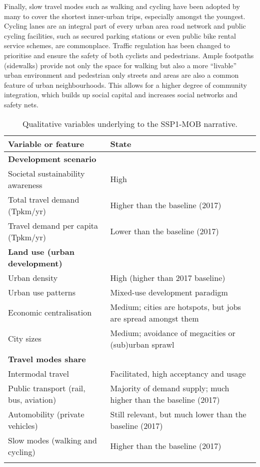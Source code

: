 {Finally, slow travel modes such as walking and cycling have been adopted by many to cover the shortest inner-urban trips, especially amongst the youngest. Cycling lanes are an integral part of every urban area road network and public cycling facilities, such as secured parking stations or even public bike rental service schemes, are commonplace. Traffic regulation has been changed to prioritise and ensure the safety of both cyclists and pedestrians. Ample footpaths (sidewalks) provide not only the space for walking but also a more ``livable'' urban environment and pedestrian only streets and areas are also a common feature of urban neighbourhoods. This allows for a higher degree of community integration, which builds up social capital and increases social networks and safety nets.
}
%
\begin{table}
\centering
\caption[SSP1-MOB qualitative variables]{Qualitative variables underlying to the SSP1-MOB narrative.}
\label{t:ssp1-mob-2100-narrative-thesis}
\footnotesize
\begin{tabular}{p{5cm}p{9cm}}
\toprule
Variable or feature & State \\ \midrule
\textbf{Development scenario} &  \\
Societal sustainability awareness & High \\
Total travel demand (Tpkm/yr) & Higher than the baseline (2017) \\
Travel demand per capita (Tpkm/yr) & Lower than the baseline (2017) \\ \addlinespace
\textbf{Land use (urban development)} &  \\
Urban density & High (higher than 2017 baseline) \\
Urban use patterns & Mixed-use development paradigm \\
Economic centralisation & Medium; cities are hotspots, but jobs are spread amongst them \\
City sizes & Medium; avoidance of megacities or (sub)urban sprawl \\\addlinespace
\textbf{Travel modes share} &  \\
Intermodal travel & Facilitated, high acceptancy and usage \\
Public transport (rail, bus, aviation) & Majority of demand supply; much higher than the baseline (2017) \\
Automobility (private vehicles) & Still relevant, but much lower than the baseline (2017) \\
Slow modes (walking and cycling) & Higher than the baseline (2017) \\\addlinespace

\end{tabular}
\end{table}
